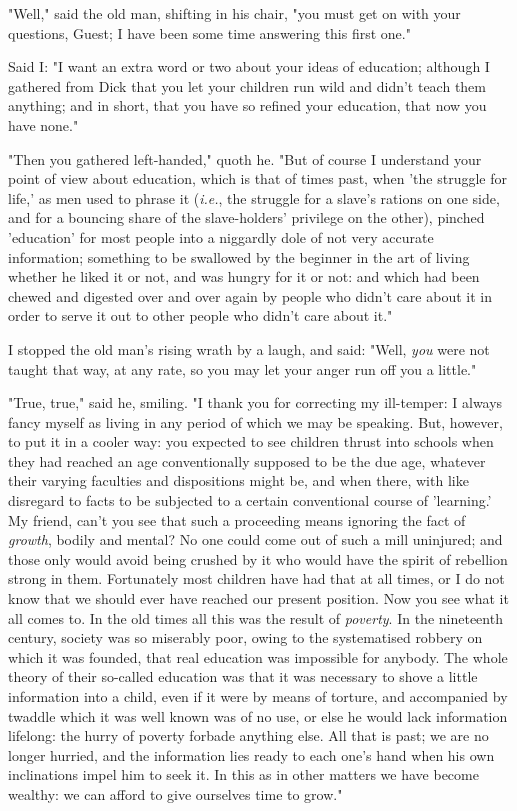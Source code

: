 "Well," said the old man, shifting in his chair, "you must get on with
your questions, Guest; I have been some time answering this first one."

Said I: "I want an extra word or two about your ideas of education;
although I gathered from Dick that you let your children run wild and
didn't teach them anything; and in short, that you have so refined your
education, that now you have none."

"Then you gathered left-handed," quoth he. "But of course I understand
your point of view about education, which is that of times past, when
'the struggle for life,' as men used to phrase it (\emph{i.e.}, the
struggle for a slave's rations on one side, and for a bouncing share of
the slave-holders' privilege on the other), pinched 'education' for most
people into a niggardly dole of not very accurate information; something
to be swallowed by the beginner in the art of living whether he liked it
or not, and was hungry for it or not: and which had been chewed and
digested over and over again by people who didn't care about it in order
to serve it out to other people who didn't care about it."

I stopped the old man's rising wrath by a laugh, and said: "Well,
\emph{you} were not taught that way, at any rate, so you may let your
anger run off you a little."

"True, true," said he, smiling. "I thank you for correcting my
ill-temper: I always fancy myself as living in any period of which we
may be speaking. But, however, to put it in a cooler way: you expected
to see children thrust into schools when they had reached an age
conventionally supposed to be the due age, whatever their varying
faculties and dispositions might be, and when there, with like disregard
to facts to be subjected to a certain conventional course of 'learning.'
My friend, can't you see that such a proceeding means ignoring the fact
of \emph{growth}, bodily and mental? No one could come out of such a
mill uninjured; and those only would avoid being crushed by it who would
have the spirit of rebellion strong in them. Fortunately most children
have had that at all times, or I do not know that we should ever have
reached our present position. Now you see what it all comes to. In the
old times all this was the result of \emph{poverty}. In the nineteenth
century, society was so miserably poor, owing to the systematised
robbery on which it was founded, that real education was impossible for
anybody. The whole theory of their so-called education was that it was
necessary to shove a little information into a child, even if it were by
means of torture, and accompanied by twaddle which it was well known was
of no use, or else he would lack information lifelong: the hurry of
poverty forbade anything else. All that is past; we are no longer
hurried, and the information lies ready to each one's hand when his own
inclinations impel him to seek it. In this as in other matters we have
become wealthy: we can afford to give ourselves time to grow."

